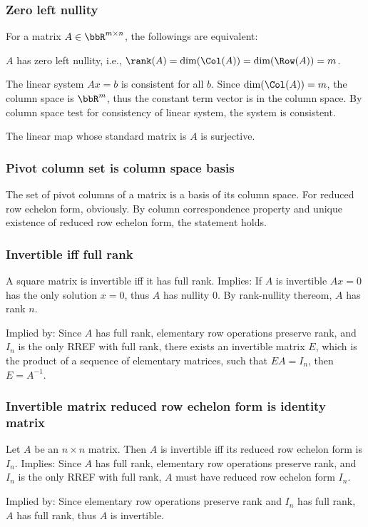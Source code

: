 \documentclass[a4paper,12pt]{report}
\begin{document}
\subsubsection{Zero left nullity}
For a matrix $A\in\bbR^{m\times n}$, the followings are equivalent:
\bit
\item $A$ has zero left nullity, i.e., $\rank(A)=\dim(\Col(A))=\dim(\Row(A))=m$.
\item The linear system $Ax=b$ is consistent for all $b$.
\bpr
Since $\dim(\Col(A))=m$, the column space is $\bbR^m$, thus the constant term vector is in the column space. By column space test for consistency of linear system, the system is consistent.
\epr
\item The linear map whose standard matrix is $A$ is surjective.
\eit
\subsubsection{Pivot column set is column space basis}
The set of pivot columns of a matrix is a basis of its column space.
\bpr
For reduced row echelon form, obviously. By column correspondence property and unique existence of reduced row echelon form, the statement holds.
\epr
\subsubsection{Invertible iff full rank}
A square matrix is invertible iff it has full rank.
\bpr
Implies: If $A$ is invertible $Ax=0$ has the only solution $x=0$, thus $A$ has nullity $0$. By rank-nullity thereom, $A$ has rank $n$.

Implied by: Since $A$ has full rank, elementary row operations preserve rank, and $I_n$ is the only RREF with full rank, there exists an invertible matrix $E$, which is the product of a sequence of elementary matrices, such that $EA=I_n$, then $E=A^{-1}$.
\epr
\subsubsection{Invertible matrix reduced row echelon form is identity matrix}
Let $A$ be an $n\times n$ matrix. Then $A$ is invertible iff its reduced row echelon form is $I_n$.
\bpr
Implies: Since $A$ has full rank, elementary row operations preserve rank, and $I_n$ is the only RREF with full rank, $A$ must have reduced row echelon form $I_n$.

Implied by: Since elementary row operations preserve rank and $I_n$ has full rank, $A$ has full rank, thus $A$ is invertible.
\epr
\end{document}
